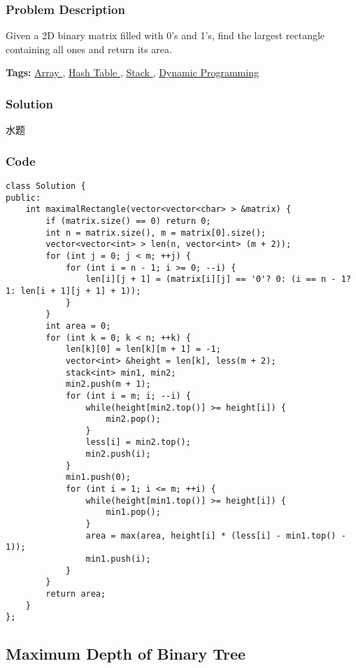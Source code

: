 \documentclass{article}
\begin{document}
\begin{CJK*}{UTF8}{gkai}
\subsubsection*{Problem Description}
Given a 2D binary matrix filled with 0's and 1's, find the largest rectangle containing all ones and return its area.


\textbf{Tags: }
\hyperref[ Array ]{ Array },  \hyperref[ Hash Table ]{ Hash Table },  \hyperref[ Stack ]{ Stack },  \hyperref[ Dynamic Programming ]{ Dynamic Programming }



\subsubsection*{Solution}
水题

\subsubsection*{Code}
\begin{lstlisting}
class Solution {
public:
    int maximalRectangle(vector<vector<char> > &matrix) {
        if (matrix.size() == 0) return 0;
        int n = matrix.size(), m = matrix[0].size();
        vector<vector<int> > len(n, vector<int> (m + 2));
        for (int j = 0; j < m; ++j) {
            for (int i = n - 1; i >= 0; --i) {
                len[i][j + 1] = (matrix[i][j] == '0'? 0: (i == n - 1? 1: len[i + 1][j + 1] + 1));
            }
        }
        int area = 0;
        for (int k = 0; k < n; ++k) {
            len[k][0] = len[k][m + 1] = -1;
            vector<int> &height = len[k], less(m + 2);
            stack<int> min1, min2;
            min2.push(m + 1);
            for (int i = m; i; --i) {
                while(height[min2.top()] >= height[i]) {
                    min2.pop();
                }
                less[i] = min2.top();
                min2.push(i);
            }
            min1.push(0);
            for (int i = 1; i <= m; ++i) {
                while(height[min1.top()] >= height[i]) {
                    min1.pop();
                }
                area = max(area, height[i] * (less[i] - min1.top() - 1));
                min1.push(i);
            }
        }
        return area;
    }
}; 
\end{lstlisting}


\subsection{ Maximum Depth of Binary Tree }
\label{ Maximum Depth of Binary Tree }


\end{CJK*}
\end{document}
